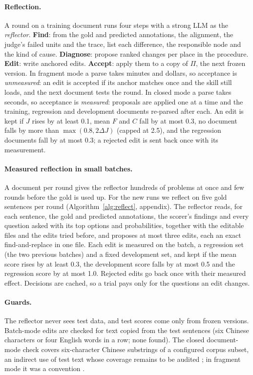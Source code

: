 \paragraph{Reflection.}
\label{sec:reflect}
A round on a training document runs four steps with a strong LLM as the \emph{reflector}. \textbf{Find}: from the gold and predicted annotations, the alignment, the judge's failed units and the trace, list each difference, the responsible node and the kind of cause. \textbf{Diagnose}: propose ranked changes per place in the procedure. \textbf{Edit}: write anchored edits. \textbf{Accept}: apply them to a copy of $\Pi$, the next frozen version. In fragment mode a parse takes minutes and dollars, so acceptance is \emph{unmeasured}: an edit is accepted if its anchor matches once and the skill still loads, and the next document tests the round. In closed mode a parse takes seconds, so acceptance is \emph{measured}: proposals are applied one at a time and the training, regression and development documents re-parsed after each. An edit is kept if $J$ rises by at least 0.1, mean $F$ and $C$ fall by at most 0.3, no document falls by more than $\max(0.8, 2\Delta J)$ (capped at 2.5), and the regression documents fall by at most 0.3; a rejected edit is sent back once with its measurement.

\paragraph{Measured reflection in small batches.}
A document per round gives the reflector hundreds of problems at once and few rounds before the gold is used up. For the new runs we reflect on five gold sentences per round (Algorithm~\ref{alg:reflect}, appendix). The reflector reads, for each sentence, the gold and predicted annotations, the scorer's findings and every question asked with its top options and probabilities, together with the editable files and the edits tried before, and proposes at most three edits, each an exact find-and-replace in one file. Each edit is measured on the batch, a regression set (the two previous batches) and a fixed development set, and kept if the mean score rises by at least 0.3, the development score falls by at most 0.5 and the regression score by at most 1.0. Rejected edits go back once with their measured effect. Decisions are cached, so a trial pays only for the questions an edit changes.

\paragraph{Guards.} The reflector never sees test data, and test scores come only from frozen versions. Batch-mode edits are checked for text copied from the test sentences (six Chinese characters or four English words in a row; none found). The closed document-mode check covers six-character Chinese substrings of a configured corpus subset, an indirect use of test text whose coverage remains to be audited ; in fragment mode it was a convention .
